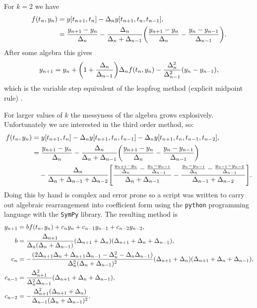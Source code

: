 For $k=2$ we have
\begin{equation}
  \begin{aligned}
    f(t_n, y_n) &= y[t_{n+1}, t_n] - \Delta_{n} y[t_{n+1}, t_n, t_{n-1}] , \\
    &=  \frac{y_{n+1} - y_n}{\Delta_{n}} 
    - \frac{\Delta_{n}}{\Delta_{n} + \Delta_{n-1}} {\left(  \frac{y_{n+1} - y_n}{\Delta_{n}} - \frac{y_n - y_{n-1}}{\Delta_{n-1}} \right)}.
  \end{aligned}
\end{equation}
After some algebra this gives
\begin{equation}
  \label{eq:emr-derivation-rearranged}
  y_{n+1} = y_n + {\left( 1 + \frac{\Delta_{n}}{\Delta_{n-1}} \right)}\Delta_{n} f(t_n, y_n)
    - \frac{\Delta_{n}^2}{\Delta_{n-1}^2}(y_n - y_{n-1}),
\end{equation}
which is the variable step equivalent of the leapfrog method (explicit midpoint rule) \cite[pg. 715]{GreshoSani}.

For larger values of $k$ the messyness of the algebra grows explosively.
Unfortunately we are interested in the third order method, so:
\begin{equation}
  \begin{aligned}
    f(t_n, y_n) &= y[t_{n+1}, t_n] - \Delta_{n} y[t_{n+1}, t_n, t_{n-1}] -\Delta_{n} y[t_{n+1}, t_n, t_{n-1}, t_{n-2}], \\
    &=  \frac{y_{n+1} - y_n}{\Delta_{n}} 
    - \frac{\Delta_{n}}{\Delta_{n} + \Delta_{n-1}} {\left(  \frac{y_{n+1} - y_n}{\Delta_{n}} - \frac{y_n - y_{n-1}}{\Delta_{n-1}} \right)} \\
    &\quad - \frac{\Delta_{n}}{\Delta_{n} + \Delta_{n-1} + \Delta_{n-2}}
         {\left[ 
           \frac{\frac{y_{n+1} - y_n}{\Delta_{n}} - \frac{y_n - y_{n-1}}{\Delta_{n-1}}}
                {\Delta_{n} +\Delta_{n-1}}
           -
           \frac{\frac{y_{n} - y_{n-1}}{\Delta_{n}} - \frac{y_{n-1} - y_{n-2}}{\Delta_{n-1}}}
                {\Delta_{n-1} +\Delta_{n-2}}
          \right]}.
  \end{aligned}
\end{equation}
Doing this by hand is complex and error prone so a script was written to carry out algebraic rearrangement into coefficient form using the \texttt{python} programming language with the \texttt{SymPy} library\cite{sympy}.
The resulting method is
\begin{equation}
  \label{eqn:ebdf-coeffs}
  \begin{aligned}
    y_{n+1} &= b f(t_n, y_n) + c_n y_n + c_{n-1} y_{n-1} + c_{n-2} y_{n-2}, \\
    b &= \frac{\Delta_{n+1}}{\Delta_{n} (\Delta_{n} + \Delta_{n-1})} (\Delta_{n+1} + \Delta_{n}) (\Delta_{n+1} + \Delta_{n} + \Delta_{n-1}) ,\\
    c_n &= - \frac{ (2 \Delta_{n+1} \Delta_{n} + \Delta_{n+1} \Delta_{n-1} - \Delta_{n}^{2} - \Delta_{n} \Delta_{n-1}) }{\Delta_{n}^{2} (\Delta_{n} + \Delta_{n-1})^{2}} (\Delta_{n+1} + \Delta_{n}) (\Delta_{n+1} + \Delta_{n} + \Delta_{n-1}),\\
    c_{n-1} &= \frac{\Delta_{n+1}^{2}}{\Delta_{n}^{2} \Delta_{n-1}} (\Delta_{n+1} + \Delta_{n} + \Delta_{n-1}) ,\\
    c_{n-2} &= - \frac{\Delta_{n+1}^{2} (\Delta_{n+1} + \Delta_{n})}{\Delta_{n-1} (\Delta_{n} + \Delta_{n-1})^{2}}.
  \end{aligned}
\end{equation}

